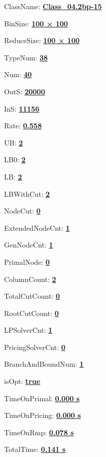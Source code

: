 \documentclass[11pt]{article}
\begin{document}
\pagestyle{empty}


ClassName: \underline{\textbf{Class_04.2bp-15}}
\par
BinSize: \underline{\textbf{100 × 100}}
\par
ReduceSize: \underline{\textbf{100 × 100}}
\par
TypeNum: \underline{\textbf{38}}
\par
Num: \underline{\textbf{40}}
\par
OutS: \underline{\textbf{20000}}
\par
InS: \underline{\textbf{11156}}
\par
Rate: \underline{\textbf{0.558}}
\par
UB: \underline{\textbf{2}}
\par
LB0: \underline{\textbf{2}}
\par
LB: \underline{\textbf{2}}
\par
LBWithCut: \underline{\textbf{2}}
\par
NodeCut: \underline{\textbf{0}}
\par
ExtendedNodeCnt: \underline{\textbf{1}}
\par
GenNodeCnt: \underline{\textbf{1}}
\par
PrimalNode: \underline{\textbf{0}}
\par
ColumnCount: \underline{\textbf{2}}
\par
TotalCutCount: \underline{\textbf{0}}
\par
RootCutCount: \underline{\textbf{0}}
\par
LPSolverCnt: \underline{\textbf{1}}
\par
PricingSolverCnt: \underline{\textbf{0}}
\par
BranchAndBoundNum: \underline{\textbf{1}}
\par
isOpt: \underline{\textbf{true}}
\par
TimeOnPrimal: \underline{\textbf{0.000 s}}
\par
TimeOnPricing: \underline{\textbf{0.000 s}}
\par
TimeOnRmp: \underline{\textbf{0.078 s}}
\par
TotalTime: \underline{\textbf{0.141 s}}
\par
\newpage
\end{document}
